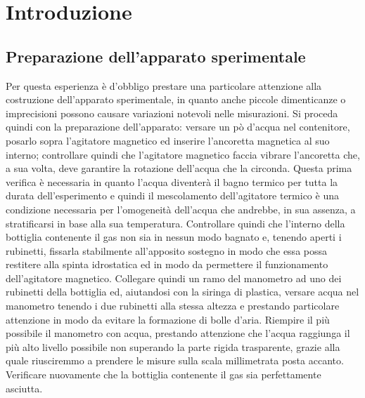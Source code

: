 \section{Introduzione}
\subsection{Preparazione dell'apparato sperimentale}

Per questa esperienza è d'obbligo prestare una particolare attenzione alla costruzione dell'apparato sperimentale, in quanto anche piccole dimenticanze o imprecisioni possono causare variazioni notevoli nelle misurazioni.
Si proceda quindi con la preparazione dell'apparato: versare un pò d'acqua nel contenitore, posarlo sopra l'agitatore magnetico ed inserire l'ancoretta magnetica al suo interno; controllare quindi che l'agitatore magnetico faccia vibrare l'ancoretta che, a sua volta, deve garantire la rotazione dell'acqua che la circonda.
Questa prima verifica è necessaria in quanto l'acqua diventerà il bagno termico per tutta la durata dell'esperimento e quindi il mescolamento dell'agitatore termico è una condizione necessaria per l'omogeneità dell'acqua che andrebbe, in sua assenza, a stratificarsi in base alla sua temperatura.
Controllare quindi che l'interno della bottiglia contenente il gas non sia in nessun modo bagnato e, tenendo aperti i rubinetti, fissarla stabilmente all'apposito sostegno in modo che essa possa restitere alla spinta idrostatica ed in modo da permettere il funzionamento dell'agitatore magnetico.
Collegare quindi un ramo del manometro ad uno dei rubinetti della bottiglia ed, aiutandosi con la siringa di plastica, versare acqua nel manometro tenendo i due rubinetti alla stessa altezza e prestando particolare attenzione in modo da evitare la formazione di bolle d'aria.
Riempire il più possibile il manometro con acqua, prestando attenzione che l'acqua raggiunga il più alto livello possibile non superando la parte rigida trasparente, grazie alla quale riusciremmo a prendere le misure sulla scala millimetrata posta accanto.
Verificare nuovamente che la bottiglia contenente il gas sia perfettamente asciutta.


